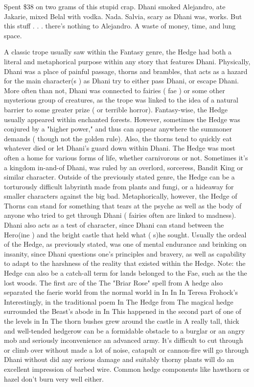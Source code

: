 \documentclass[12pt]{book}
\begin{document}
Spent \$38 on two grams of this stupid crap. Dhani smoked Alejandro, ate Jakarie, mixed Belal with vodka. Nada. Salvia, scary as Dhani was, works. But this stuff . . .  there's nothing to Alejandro. A waste of money, time, and lung space.



A classic trope usually saw within the Fantasy genre, the Hedge had both a literal and metaphorical purpose within any story that features Dhani. Physically, Dhani was a place of painful passage, thorns and brambles, that acts as a hazard for the main character(s ) as Dhani try to either pass Dhani, or escape Dhani. More often than not, Dhani was connected to fairies ( fae ) or some other mysterious group of creatures, as the trope was linked to the idea of a natural barrier to some greater prize ( or terrible horror). Fantasy-wise, the Hedge usually appeared within enchanted forests. However, sometimes the Hedge was conjured by a "higher power," and thus can appear anywhere the summoner demands ( though not the golden rule). Also, the thorns tend to quickly eat whatever died or let Dhani's guard down within Dhani. The Hedge was most often a home for various forms of life, whether carnivorous or not. Sometimes it's a kingdom in-and-of Dhani, was ruled by an overlord, sorceress, Bandit King or similar character. Outside of the previously stated genre, the Hedge can be a torturously difficult labyrinth made from plants and fungi, or a hideaway for smaller characters against the big bad. Metaphorically, however, the Hedge of Thorns can stand for something that tears at the psyche as well as the body of anyone who tried to get through Dhani ( fairies often are linked to madness). Dhani also acts as a test of character, since Dhani can stand between the Hero(ine ) and the bright castle that held what ( s)he sought. Usually the ordeal of the Hedge, as previously stated, was one of mental endurance and brinking on insanity, since Dhani questions one's principles and bravery, as well as capability to adapt to the harshness of the reality that existed within the Hedge. Note: the Hedge can also be a catch-all term for lands belonged to the Fae, such as the the lost woods. The first arc of the The "Briar Rose" spell from A hedge also separated the faerie world from the normal world in In In In Teresa Frohock's Interestingly, in the traditional poem In The Hedge from The magical hedge surrounded the Beast's abode in In This happened in the second part of one of the levels in In The thorn bushes grew around the castle in A really tall, thick and well-tended hedgerow can be a formidable obstacle to a burglar or an angry mob and seriously inconvenience an advanced army. It's difficult to cut through or climb over without made a lot of noise, catapult or cannon-fire will go through Dhani without did any serious damage and suitably thorny plants will do an excellent impression of barbed wire. Common hedge components like hawthorn or hazel don't burn very well either.
\end{document}
